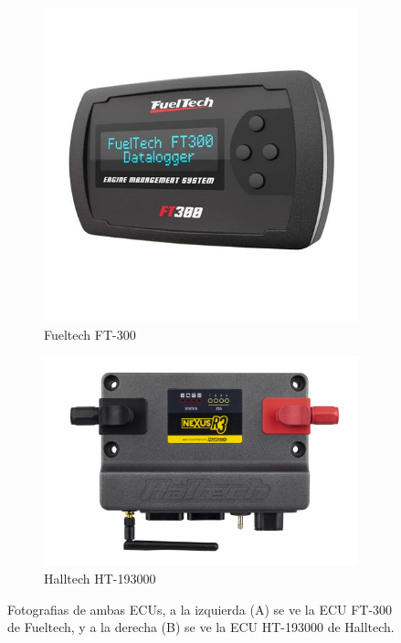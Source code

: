 \begin{figure}[htpb]
\centering
\begin{subfigure}{.4\textwidth}
\centering
\includegraphics[width=\textwidth]{./Figures/fueltech-ft300.jpg}
\caption{Fueltech FT-300}
\label{fig:fueltech}
\end{subfigure}
\hfill
\begin{subfigure}{.5\textwidth}
\centering
\includegraphics[width=\textwidth]{./Figures/HT-193000_00.JPG}
\caption{Halltech HT-193000}
\label{fig:halltech}
\end{subfigure}
\hfill
\caption{Fotografias de ambas ECUs, a la izquierda (A) se ve la ECU FT-300 de Fueltech, y a la derecha (B) se ve la ECU HT-193000 de Halltech.}
\label{fig:comparativa}
\end{figure}

